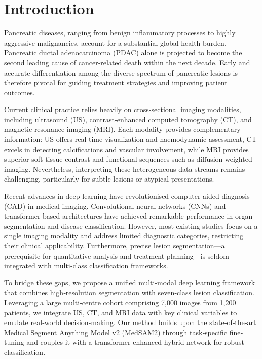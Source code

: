 \documentclass[a4paper, fleqn]{cas-dc}
\begin{document}
    \maketitle

    \section{Introduction}

    Pancreatic diseases, ranging from benign inflammatory processes to highly
    aggressive malignancies, account for a substantial global health burden.
    Pancreatic ductal adenocarcinoma (PDAC) alone is projected to become the
    second leading cause of cancer‐related death within the next decade\citep{Siegel2024}.
    Early and accurate differentiation among the diverse spectrum of pancreatic lesions
    is therefore pivotal for guiding treatment strategies and improving patient outcomes.

    Current clinical practice relies heavily on cross‐sectional imaging modalities,
    including ultrasound (US), contrast‐enhanced computed tomography (CT), and
    magnetic resonance imaging (MRI). Each modality provides complementary information:
    US offers real‐time visualization and haemodynamic assessment, CT excels in detecting
    calcifications and vascular involvement, while MRI provides superior
    soft‐tissue contrast and functional sequences such as diffusion‐weighted
    imaging. Nevertheless, interpreting these heterogeneous data streams remains
    challenging, particularly for subtle lesions or atypical presentations.

    Recent advances in deep learning have revolutionised computer‐aided diagnosis
    (CAD) in medical imaging. Convolutional neural networks (CNNs) and
    transformer‐based architectures have achieved remarkable performance in
    organ segmentation and disease classification\citep{Litjens2017}. However,
    most existing studies focus on a single imaging modality and address limited
    diagnostic categories, restricting their clinical applicability. Furthermore,
    precise lesion segmentation—a prerequisite for quantitative analysis and treatment
    planning—is seldom integrated with multi‐class classification frameworks.

    To bridge these gaps, we propose a unified multi‐modal deep learning
    framework that combines high‐resolution segmentation with seven‐class lesion
    classification. Leveraging a large multi‐centre cohort comprising 7,000 images
    from 1,200 patients, we integrate US, CT, and MRI data with key clinical
    variables to emulate real‐world decision‐making. Our method builds upon the state‐of‐the‐art
    Medical Segment Anything Model v2 (MedSAM2) through task‐specific fine‐tuning
    and couples it with a transformer‐enhanced hybrid network for robust classification.
\end{document}
